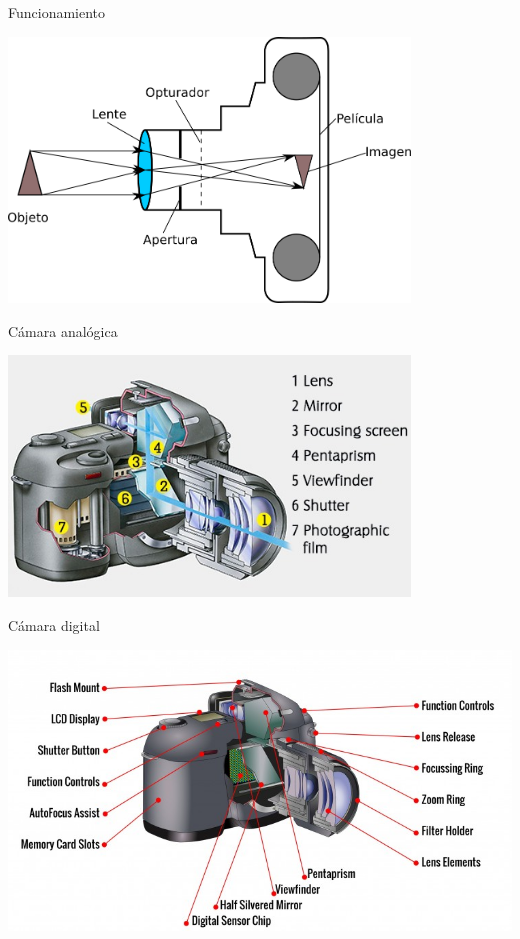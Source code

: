 \documentclass{if-beamer}
\begin{document}
\begin{frame}{Funcionamiento}
\begin{center}
    \includegraphics[width=0.8\textwidth]{cameraDiagram.png}
\end{center}
\end{frame}

\begin{frame}{Cámara analógica}
    \begin{center}
        \includegraphics[width=0.8\textwidth]{analogDiagram.jpeg}
    \end{center}
\end{frame}

\begin{frame}{Cámara digital}
    \begin{center}
        \includegraphics[width=\textwidth]{digitalDiagram.jpg}
    \end{center}
\end{frame}
\end{document}
